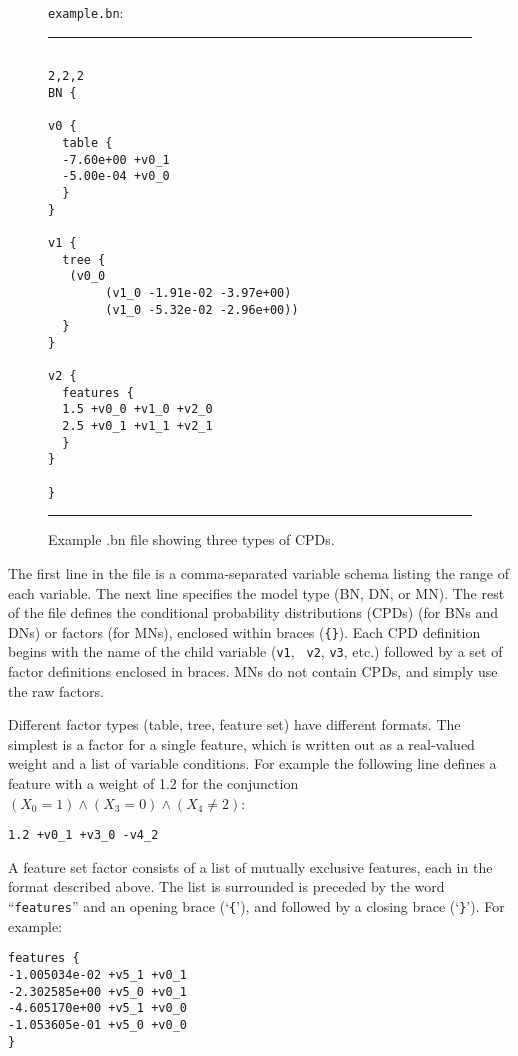 \documentclass[11pt]{article}
\begin{document}
\begin{figure}[tb]
{\tt example.bn}:
\hrule
\begin{small}
\begin{verbatim}

2,2,2
BN {

v0 {
  table {
  -7.60e+00 +v0_1
  -5.00e-04 +v0_0
  }
}

v1 {
  tree {
   (v0_0
        (v1_0 -1.91e-02 -3.97e+00)
        (v1_0 -5.32e-02 -2.96e+00))
  }
}

v2 {
  features {
  1.5 +v0_0 +v1_0 +v2_0
  2.5 +v0_1 +v1_1 +v2_1
  }
}

}
\end{verbatim}
\end{small}
\hrule
\caption{Example .bn file showing three types of CPDs.}
\label{fig:bn}
\end{figure}

The first line in the file is a comma-separated variable schema
listing the range of each variable.  The next line specifies
the model type (BN, DN, or MN).  The rest of the file defines the
conditional probability distributions (CPDs) (for BNs and DNs) or
factors (for MNs), enclosed within braces ({\tt \{\}}).  Each CPD
definition begins with the name of the child variable ({\tt v1}, {\tt
v2}, {\tt v3}, etc.) followed by a set of factor definitions enclosed
in braces.  MNs do not contain CPDs, and simply use the raw factors.

Different factor types (table, tree, feature set) have
different formats.  The simplest is a factor for a single feature,
which is written out as a real-valued weight and a list of variable
conditions.  For example the following line defines a feature with a
weight of 1.2 for the conjunction $(X_0 = 1) \wedge (X_3 = 0) \wedge
(X_4 \neq 2)$:
\begin{verbatim}
1.2 +v0_1 +v3_0 -v4_2
\end{verbatim}


A feature set factor consists of a list of mutually exclusive features, each in
the format described above.  The list is surrounded is preceded by the word
``{\tt features}'' and an opening brace (`{\tt \{}'), and followed by a closing
brace (`{\tt \}}').  For example:
\begin{verbatim}
features {
-1.005034e-02 +v5_1 +v0_1
-2.302585e+00 +v5_0 +v0_1
-4.605170e+00 +v5_1 +v0_0
-1.053605e-01 +v5_0 +v0_0
}
\end{verbatim}
\end{document}
